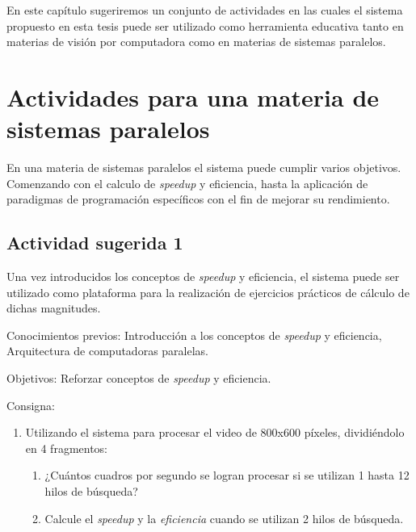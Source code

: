 
En este capítulo sugeriremos un conjunto de actividades en las cuales el sistema
propuesto en esta tesis puede ser utilizado como herramienta educativa tanto en
materias de visión por computadora como en materias de sistemas paralelos.

\section{Actividades para una materia de sistemas paralelos}

\label{eduparalelos}

En una materia de sistemas paralelos el sistema puede cumplir varios objetivos.
Comenzando con el calculo de \emph{speedup} y eficiencia, hasta la aplicación de
paradigmas de programación específicos con el fin de mejorar su rendimiento.

\subsection{Actividad sugerida 1}

Una vez introducidos los conceptos de \emph{speedup} y eficiencia, el sistema
puede ser utilizado como plataforma para la realización de ejercicios prácticos
de cálculo de dichas magnitudes.

\begin{description}

	\item{Conocimientos previos}: Introducción a los conceptos de
		\emph{speedup} y eficiencia, Arquitectura de computadoras
		paralelas.

	\item{Objetivos}: Reforzar conceptos de \emph{speedup} y eficiencia.

	\item{Consigna}: \begin{enumerate}

	\item{Utilizando el sistema para procesar el video de 800x600 píxeles,
		dividiéndolo en 4 fragmentos:

\begin{enumerate}

	\item{¿Cuántos cuadros por segundo se logran procesar si se utilizan 1
		hasta 12 hilos de búsqueda?}

	\item{Calcule el \emph{speedup} y la \emph{eficiencia} cuando se
		utilizan 2 hilos de búsqueda.}

\end{enumerate}}

\end{enumerate}

\end{description}

